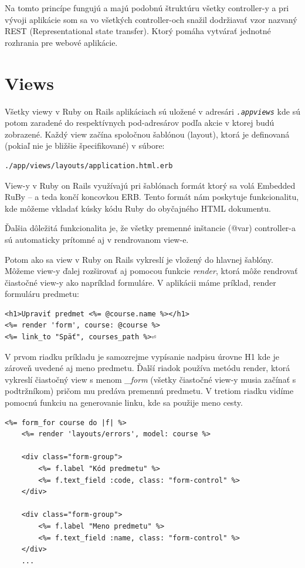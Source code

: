Na tomto princípe fungujú a majú podobnú štruktúru všetky controller-y a pri vývoji aplikácie som sa vo všetkých controller-och snažil dodržiavať vzor nazvaný REST (Representational state transfer). Ktorý pomáha vytvárať jednotné rozhrania pre webové aplikácie.

\section{Views}

Všetky viewy v Ruby on Rails aplikáciach sú uložené v adresári \emph{\texttt{.\/app\/views}} kde sú potom zaradené do respektívnych pod-adresárov podľa akcie v ktorej budú zobrazené. Každý view začína spoločnou šablónou (layout), ktorá je definovaná (pokiaľ nie je bližšie špecifikované) v súbore:

\begin{verbatim}
./app/views/layouts/application.html.erb
\end{verbatim}

View-y v Ruby on Rails využívajú pri šablónach formát ktorý sa volá Embedded RuBy -- a teda končí koncovkou ERB. Tento formát nám poskytuje funkcionalitu, kde môžeme vkladať kúsky kódu Ruby do obyčajného HTML dokumentu.

Ďalšia dôležitá funkcionalita je, že všetky premenné inštancie (@var) controller-a sú automaticky prítomné aj v rendrovanom view-e.

Potom ako sa view v Ruby on Rails vykreslí je vložený do hlavnej šablóny. Môžeme view-y ďalej rozširovať aj pomocou funkcie \emph{render}, ktorá môže rendrovať čiastočné view-y ako napríklad formuláre. V aplikácii máme príklad, render formuláru predmetu:

\begin{verbatim}
<h1>Upraviť predmet <%= @course.name %></h1>
<%= render 'form', course: @course %>
<%= link_to "Späť", courses_path %>⏎
\end{verbatim}

V prvom riadku príkladu je samozrejme vypísanie nadpisu úrovne H1 kde je zároveň uvedené aj meno predmetu. Ďalší riadok používa metódu render, ktorá vykreslí čiastočný view s menom \emph{\_form} (všetky čiastočné view-y musia začínať s podtržníkom) pričom mu predáva premennú predmetu. V tretiom riadku vidíme pomocnú funkciu na generovanie linku, kde sa použije meno cesty.

\clearpage
\begin{verbatim}
<%= form_for course do |f| %>
    <%= render 'layouts/errors', model: course %>

    <div class="form-group">
        <%= f.label "Kód predmetu" %>
        <%= f.text_field :code, class: "form-control" %>
    </div>

    <div class="form-group">
        <%= f.label "Meno predmetu" %>
        <%= f.text_field :name, class: "form-control" %>
    </div>
    ...
\end{verbatim}


